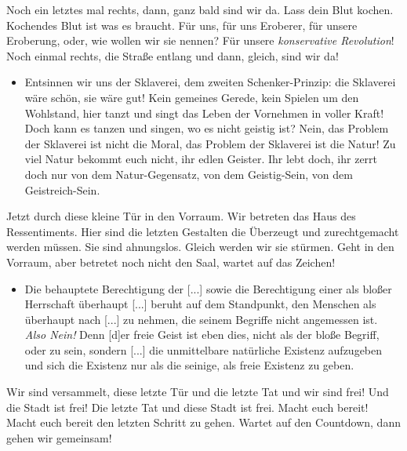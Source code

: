 \documentclass[a4paper, 12pt]{report}
\begin{document}
Noch ein letztes mal rechts, dann, ganz bald sind wir da. 
Lass dein Blut kochen.
Kochendes Blut ist was es braucht. Für uns, für uns Eroberer, für unsere Eroberung, oder, wie wollen wir sie nennen? 
Für unsere \textit{konservative Revolution}!
Noch einmal rechts, die Straße entlang und dann, gleich, sind wir da!

\begin{itemize}\em
\item[] Entsinnen wir uns der Sklaverei, dem zweiten Schenker-Prinzip: 
    die Sklaverei wäre schön, sie wäre gut! 
    Kein gemeines Gerede, kein Spielen um den Wohlstand, hier tanzt und singt das Leben der Vornehmen in voller Kraft! 
    Doch kann es tanzen und singen, wo es nicht geistig ist? 
    Nein, das Problem der Sklaverei ist nicht die Moral, das Problem der Sklaverei ist die Natur!
    Zu viel Natur bekommt euch nicht, ihr edlen Geister.
    Ihr lebt doch, ihr zerrt doch nur von dem Natur-Gegensatz, von dem Geistig-Sein, von dem Geistreich-Sein.
\end{itemize}

Jetzt durch diese kleine Tür in den Vorraum. 
Wir betreten das Haus des Ressentiments. 
Hier sind die letzten Gestalten die Überzeugt und zurechtgemacht werden müssen. 
Sie sind ahnungslos. 
Gleich werden wir sie stürmen. 
Geht in den Vorraum, aber betretet noch nicht den Saal, wartet auf das Zeichen!

\begin{itemize}\em
\item[] Die behauptete Berechtigung der  [...] sowie die Berechtigung einer  als bloßer Herrschaft überhaupt [...] beruht auf dem Standpunkt, den Menschen als  überhaupt nach  [...] zu nehmen, die seinem Begriffe nicht angemessen ist.\\
    \emph{Also Nein!} Denn [d]er freie Geist ist eben dies, nicht als der bloße Begriff, oder  zu sein, sondern [...] die unmittelbare natürliche Existenz aufzugeben und sich die Existenz nur als die seinige, als freie Existenz zu geben.
\end{itemize}

Wir sind versammelt, diese letzte Tür und die letzte Tat und wir sind frei! 
Und die Stadt ist frei!
Die letzte Tat und diese Stadt ist frei. 
Macht euch bereit! 
Macht euch bereit den letzten Schritt zu gehen. 
Wartet auf den Countdown, dann gehen wir gemeinsam!\\
\end{document}
